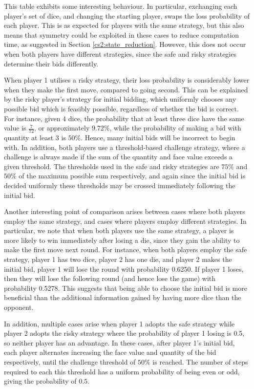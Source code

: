 This table exhibits some interesting behaviour. In particular, exchanging each player's set of dice, and changing the starting player, swaps the loss probability of each player. This is as expected for players with the same strategy, but this also means that symmetry could be exploited in these cases to reduce computation time, as suggested in Section \ref{cs2:state_reduction}. However, this does not occur when both players have different strategies, since the safe and risky strategies determine their bids differently.

When player 1 utilises a risky strategy, their loss probability is considerably lower when they make the first move, compared to going second. This can be explained by the risky player's strategy for initial bidding, which uniformly chooses any possible bid which is feasibly possible, regardless of whether the bid is correct. For instance, given 4 dice, the probability that at least three dice have the same value is $\frac{7}{72}$, or approximately $9.72\%$, while the probability of making a bid with quantity at least 3 is $50\%$. Hence, many initial bids will be incorrect to begin with. In addition, both players use a threshold-based challenge strategy, where a challenge is always made if the sum of the quantity and face value exceeds a given threshold. The thresholds used in the safe and risky strategies are $75\%$ and $50\%$ of the maximum possible sum respectively, and again since the initial bid is decided uniformly these thresholds may be crossed immediately following the initial bid.

Another interesting point of comparison arises between cases where both players employ the same strategy, and cases where players employ different strategies. In particular, we note that when both players use the same strategy, a player is more likely to win immediately after losing a die, since they gain the ability to make the first move next round. For instance, when both players employ the safe strategy, player 1 has two dice, player 2 has one die, and player 2 makes the initial bid, player 1 will lose the round with probability 0.6250. If player 1 loses, then they will lose the following round (and hence lose the game) with probability 0.5278. This suggests that being able to choose the initial bid is more beneficial than the additional information gained by having more dice than the opponent.

In addition, multiple cases arise when player 1 adopts the safe strategy while player 2 adopts the risky strategy where the probability of player 1 losing is 0.5, so neither player has an advantage. In these cases, after player 1's initial bid, each player alternates increasing the face value and quantity of the bid respectively, until the challenge threshold of $50\%$ is reached. The number of steps required to each this threshold has a uniform probability of being even or odd, giving the probability of $0.5$.

